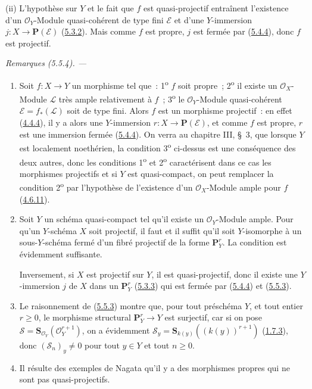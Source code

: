 (ii) L'hypothèse sur $Y$ et le fait que $f$ est quasi-projectif entraînent
l'existence d'un $\mathcal{O}_Y$-Module quasi-cohérent de type fini
$\mathcal{E}$ et d'une $Y$-immersion $j:X\to\mathbf{P}(\mathcal{E})$
(\hyperref[II.5.3.2-fr]{5.3.2}). Mais comme $f$ est propre, $j$ est fermée par
(\hyperref[II.5.4.4-fr]{5.4.4}), donc $f$ est projectif.

\par\medskip\noindent\textit{Remarques (5.5.4). ---\ }
\label{II.5.5.4-fr}
\begin{enumerate}
  \item[\rm{(i)}] Soit $f:X\to Y$ un morphisme tel que~:
  1\textsuperscript{o} $f$ soit propre~; 2\textsuperscript{o} il existe un
  $\mathcal{O}_X$-Module $\mathcal{L}$ très ample relativement à $f$~;
  3\textsuperscript{o} le $\mathcal{O}_Y$-Module quasi-cohérent
  $\mathcal{E}=f_*(\mathcal{L})$ soit de type fini. Alors $f$ est un morphisme
  projectif~: en effet (\hyperref[II.4.4.4-fr]{4.4.4}), il y a alors une
  $Y$-immersion $r:X\to\mathbf{P}(\mathcal{E})$, et comme $f$ est propre, $r$
  est une immersion fermée (\hyperref[II.5.4.4-fr]{5.4.4}). On verra au
  chapitre III, \S~3, que lorsque $Y$ est localement noethérien, la condition
  3\textsuperscript{o} ci-dessus est une conséquence des deux autres, donc les
  conditions 1\textsuperscript{o} et 2\textsuperscript{o} caractérisent dans
  ce cas les morphismes projectifs et si $Y$ est quasi-compact, on peut
  remplacer la condition 2\textsuperscript{o} par l'hypothèse de l'existence
  d'un $\mathcal{O}_X$-Module ample pour $f$
  (\hyperref[II.4.6.11-fr]{4.6.11}).
  \item[\rm{(ii)}] Soit $Y$ un schéma quasi-compact tel qu'il existe un
  $\mathcal{O}_Y$-Module ample. Pour qu'un $Y$-schéma $X$ soit projectif, il
  faut et il suffit qu'il soit $Y$-isomorphe à un sous-$Y$-schéma fermé d'un
  fibré projectif de la forme $\mathbf{P}_Y^r$. La condition est évidemment
  suffisante.


  Inversement, si $X$ est projectif sur $Y$, il est quasi-projectif, donc il
  existe une $Y$-immersion $j$ de $X$ dans un $\mathbf{P}_Y^r$
  (\hyperref[II.5.3.3-fr]{5.3.3}) qui est fermée par
  (\hyperref[II.5.4.4-fr]{5.4.4}) et
  (\hyperref[II.5.5.3-fr]{5.5.3}).
  \item[\rm{(iii)}] Le raisonnement de
  (\hyperref[II.5.5.3-fr]{5.5.3}) montre que, pour tout préschéma $Y$, et tout
  entier $r\geq0$, le morphisme structural $\mathbf{P}_Y^r\to Y$ est
  surjectif, car si on pose
  $\mathcal{S}=\mathbf{S}_{\mathcal{O}_Y}(\mathcal{O}_Y^{r+1})$, on a
  évidemment $\mathcal{S}_y=\mathbf{S}_{k(y)}((k(y))^{r+1})$
  (\hyperref[II.1.7.3-fr]{1.7.3}), donc $(\mathcal{S}_n)_y\neq0$ pour tout
  $y\in Y$ et tout $n\geq0$.
  \item[\rm{(iv)}] Il résulte des exemples de Nagata \cite{II-26} qu'il y a
  des morphismes propres qui ne sont pas quasi-projectifs.
\end{enumerate}

